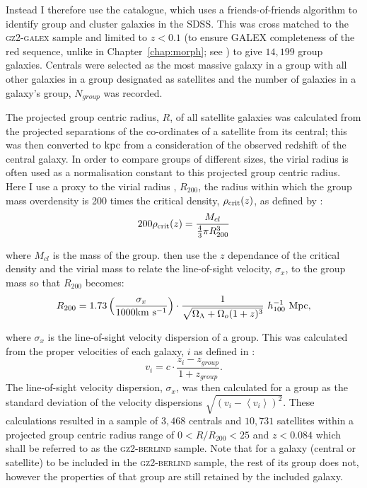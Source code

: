 Instead I therefore use the \citet{berlind06} catalogue, which uses a friends-of-friends algorithm to identify group and cluster galaxies in the SDSS. This was cross matched to the \textsc{gz2-galex} sample and limited to $z < 0.1$ (to ensure GALEX completeness of the red sequence, unlike in Chapter~\ref{chap:morph}; see \citealt{Wyder07, Yesuf14}) to give $14,199$ group galaxies. Centrals were selected as the most massive galaxy in a group \citep[as in][]{yang07, yang09, pasquali10} with all other galaxies in a group designated as satellites and the number of galaxies in a galaxy's group, $N_{group}$ was recorded. 

The projected group centric radius, $R$, of all satellite galaxies was calculated from the projected separations of the co-ordinates of a satellite from its central; this was then converted to $\rm{kpc}$ from a consideration of the observed redshift of the central galaxy. In order to compare groups of different sizes, the virial radius is often used as a normalisation constant to this projected group centric radius. Here I use a proxy to the virial radius \citep[see][]{navarro95}, $R_{200}$, the radius within which the group mass overdensity is 200 times the critical density, $\rho_{\rm{crit}}(z)$, as defined by \citealt{finn05}:
\begin{equation}\label{eq:overdense}
200\rho_{\rm{crit}}(z) = \frac{M_{cl}}{\frac{4}{3}\pi R_{200}^3}
\end{equation}

where $M_{cl}$ is the mass of the group. \citeauthor{finn05} then use the $z$ dependance of the critical density and the virial mass to relate the line-of-sight velocity, $\sigma_x$, to the group mass so that $R_{200}$ becomes:
\begin{equation}\label{eq:r200}
R_{200} = 1.73 \left ( \frac{\sigma_x}{1000 \rm{km}~\rm{s}^{-1}} \right) \cdot \frac{1}{\sqrt{\Omega_{\Lambda} +\Omega_o(1+z)^3}} ~ h_{100}^{-1} ~\rm{Mpc}, 
\end{equation}

where $\sigma_x$ is the line-of-sight velocity dispersion of a group. This was calculated from the proper velocities of each galaxy, $i$ as defined in \cite{danese80}:
\begin{equation}\label{eq:propervel}
v_i = c \cdot \frac{z_i - z_{group}}{1 + z_{group}}.
\end{equation}
The line-of-sight velocity dispersion, $\sigma_x$, was then calculated for a group as the standard deviation of the velocity dispersions $\sqrt{(v_i - \left< v_i\right>)^2}$. These calculations resulted in a sample of $3,468$ centrals and $10,731$ satellites within a projected group centric radius range of $0 < R/R_{200} < 25$ and $z < 0.084$ which shall be referred to as the \textsc{gz2-berlind} sample. Note that for a galaxy (central or satellite) to be included in the \textsc{gz2-berlind} sample, the rest of its group does not, however the properties of that group are still retained by the included galaxy. 

